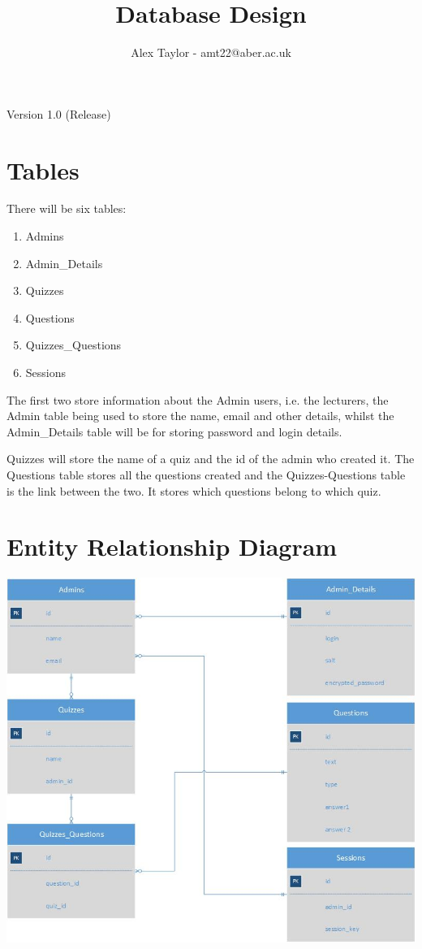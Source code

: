 \documentclass{article}
\title{Database Design}
\author{Alex Taylor - amt22@aber.ac.uk}
\begin{document}
\maketitle
\begin{center}
	Version 1.0 (Release)
\end{center}
\tableofcontents
\thispagestyle{empty}
\newpage

\section{Tables}
There will be six tables:
\begin{enumerate}
	\item Admins
	\item Admin\_Details
	\item Quizzes
	\item Questions
	\item Quizzes\_Questions
	\item Sessions
\end{enumerate}

The first two store information about the Admin users, i.e. the lecturers, the Admin table being used to store the name, email and other details, whilst the Admin\_Details table will be for storing password and login details.

Quizzes will store the name of a quiz and the id of the admin who created it. The Questions table stores all the questions created and the Quizzes-Questions table is the link between the two. It stores which questions belong to which quiz.

\section{Entity Relationship Diagram}
\includegraphics[width=\textwidth]{ERDiagram}
\end{document}
